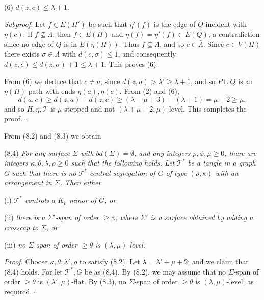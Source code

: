 \hspace*{12pt}(6) $d(z, c) \le \lambda + 1$.

\textit{Subproof.} Let $f \in E(H')$ be such that $\eta'(f)$ is the edge of $Q$ incident with $\eta(c)$. If $f \not\subseteq \Lambda$, then $f \in E(H)$ and $\eta(f) = \eta'(f) \in E(Q)$, a contradiction since no edge of $Q$ is in $E(\eta(H))$. Thus $f \subseteq \Lambda$, and so $c \in \bar{\Lambda}$. Since $c \in V(H)$ there exists $\sigma \in \Lambda$ with $d(c, \sigma) \le 1$, and consequently $d(z, c) \le d(z, \sigma) + 1 \le \lambda + 1$. This proves (6).

From (6) we deduce that $c \ne a$, since $d(z, a) > \lambda' \ge \lambda + 1$, and so $P \cup Q$ is an $\eta(H)$-path with ends $\eta(a), \eta(c)$. From (2) and (6),
\begin{equation*}
d(a, c) \ge d(z, a) - d(z, c) \ge (\lambda + \mu + 3) - (\lambda + 1) = \mu + 2 \ge \mu,
\end{equation*}
and so $H, \eta, \mathscr{T}$ is $\mu$-stepped and not $(\lambda + \mu + 2, \mu)$-level. This completes the proof. $\square$

From (8.2) and (8.3) we obtain

\stmt
(8.4) \textit{For any surface $\Sigma$ with $bd(\Sigma) = \emptyset$, and any integers $p, \phi, \mu \ge 0$, there are integers $\kappa, \theta, \lambda, \rho \ge 0$ such that the following holds. Let $\mathscr{T}^*$ be a tangle in a graph $G$ such that there is no $\mathscr{T}^*$-central segregation of $G$ of type $(\rho, \kappa)$ with an arrangement in $\Sigma$. Then either}

\hspace*{12pt}(i) \textit{$\mathscr{T}^*$ controls a $K_p$ minor of $G$, or}

\hspace*{12pt}(ii) \textit{there is a $\Sigma'$-span of order $\ge \phi$, where $\Sigma'$ is a surface obtained by adding a crosscap to $\Sigma$, or}

\hspace*{12pt}(iii) \textit{no $\Sigma$-span of order $\ge \theta$ is $(\lambda, \mu)$-level.}

\textit{Proof.} Choose $\kappa, \theta, \lambda', \rho$ to satisfy (8.2). Let $\lambda = \lambda' + \mu + 2$; and we claim that (8.4) holds. For let $\mathscr{T}^*, G$ be as (8.4). By (8.2), we may assume that no $\Sigma$-span of order $\ge \theta$ is $(\lambda', \mu)$-flat. By (8.3), no $\Sigma$-span of order $\ge \theta$ is $(\lambda, \mu)$-level, as required. $\square$

